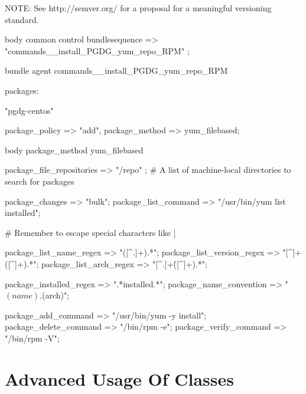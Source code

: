 NOTE: See http://semver.org/ for a proposal for a meaningful versioning standard.

\begin{codelisting}
\begin{code}
body common control {
        bundlesequence => { "commands__install_PGDG_yum_repo_RPM" };
}


bundle agent commands__install_PGDG_yum_repo_RPM {

  packages:

      "pgdg-centos"

        package_policy => "add",
        package_method => yum_filebased;

}


body package_method yum_filebased
{
        package_file_repositories => { "/repo" };   
        # A list of machine-local directories to search for packages

        package_changes => "bulk";
        package_list_command => "/usr/bin/yum list installed";

      # Remember to escape special characters like |

        package_list_name_regex    => "([^.]+).*";
        package_list_version_regex => "[^\s]\s+([^\s]+).*";
        package_list_arch_regex    => "[^.]+\.([^\s]+).*";

        package_installed_regex => ".*installed.*";
        package_name_convention => "$(name).$(arch)";

        package_add_command => "/usr/bin/yum -y install";
        package_delete_command => "/bin/rpm -e";
        package_verify_command => "/bin/rpm -V";
}

\end{code}
\end{codelisting}





\section{Advanced Usage Of Classes}

